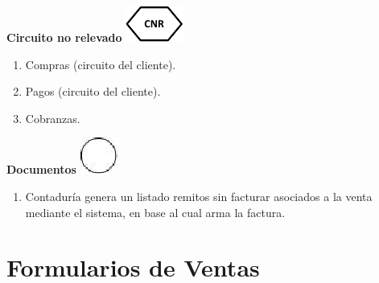 \begin{center}
  \textbf{Circuito no relevado}
  \includegraphics{./Images/Simbolos/simbolo-CNR.png}
\end{center}
\begin{enumerate}
  \item Compras (circuito del cliente).
  \item Pagos (circuito del cliente).
  \item Cobranzas.
\end{enumerate}

\begin{center}
  \textbf{Documentos}
  \includegraphics{./Images/Simbolos/simbolo-Operacion.png}
\end{center}
\begin{enumerate}
  \item Contaduría genera un listado remitos sin facturar asociados a la venta mediante el sistema, en base al cual arma la factura.
\end{enumerate}

\pagebreak
\section{Formularios de Ventas}

